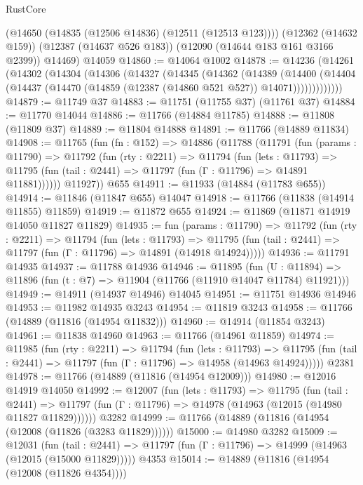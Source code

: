 \begin{lexlean}{RustCore}
\begin{coremodule}
      (@14650 (@14835 (@12506 @14836) (@12511 (@12513 @123))))
      (@12362 (@14632 @159))
      (@12387 (@14637 @526 @183))
      (@12090 (@14644 @183 @161 @3166 @2399))
      @14469)
    @14059
@14860 := @14064 @1002
@14878 := @14236
    (@14261
      (@14302
        (@14304
          (@14306
            (@14327
              (@14345
                (@14362
                  (@14389
                    (@14400
                      (@14404
                        (@14437 (@14470 (@14859 (@12387 (@14860 @521 @527)) @14071)))))))))))))
@14879 := @11749 @37
@14883 := @11751 (@11755 @37) (@11761 @37)
@14884 := @11770 @14044
@14886 := @11766 (@14884 @11785)
@14888 := @11808 (@11809 @37)
@14889 := @11804 @14888
@14891 := @11766 (@14889 @11834)
@14908 := @11765
    (fun (fn : @152) =>
    @14886
      (@11788
        (@11791
          (fun (params : @11790) =>
          @11792
            (fun (rty : @2211) =>
            @11794
              (fun (lets : @11793) =>
              @11795 (fun (tail : @2441) => @11797 (fun (Γ : @11796) => @14891 @11881))))))
        @11927))
    @655
@14911 := @11933 (@14884 (@11783 @655))
@14914 := @11846 (@11847 @655) @14047
@14918 := @11766 (@11838 (@14914 @11855) @11859)
@14919 := @11872 @655
@14924 := @11869 (@11871 @14919 @14050 @11827 @11829)
@14935 := fun (params : @11790) =>
  @11792
    (fun (rty : @2211) =>
    @11794
      (fun (lets : @11793) =>
      @11795 (fun (tail : @2441) => @11797 (fun (Γ : @11796) => @14891 (@14918 @14924)))))
@14936 := @11791 @14935
@14937 := @11788 @14936
@14946 := @11895
    (fun (U : @11894) => @11896 (fun (t : @7) => @11904 (@11766 (@11910 @14047 @11784) @11921)))
@14949 := @14911 (@14937 @14946) @14045
@14951 := @11751 @14936 @14946
@14953 := @11982 @14935 @3243
@14954 := @11819 @3243
@14958 := @11766 (@14889 (@11816 (@14954 @11832)))
@14960 := @14914 (@11854 @3243)
@14961 := @11838 @14960
@14963 := @11766 (@14961 @11859)
@14974 := @11985
    (fun (rty : @2211) =>
    @11794
      (fun (lets : @11793) =>
      @11795 (fun (tail : @2441) => @11797 (fun (Γ : @11796) => @14958 (@14963 @14924)))))
    @2381
@14978 := @11766 (@14889 (@11816 (@14954 @12009)))
@14980 := @12016 @14919 @14050
@14992 := @12007
    (fun (lets : @11793) =>
    @11795
      (fun (tail : @2441) =>
      @11797 (fun (Γ : @11796) => @14978 (@14963 (@12015 (@14980 @11827 @11829))))))
    @3282
@14999 := @11766 (@14889 (@11816 (@14954 (@12008 (@11826 (@3283 @11829))))))
@15000 := @14980 @3282
@15009 := @12031
    (fun (tail : @2441) => @11797 (fun (Γ : @11796) => @14999 (@14963 (@12015 (@15000 @11829)))))
    @4353
@15014 := @14889 (@11816 (@14954 (@12008 (@11826 @4354))))

\end{coremodule}
\end{lexlean}
